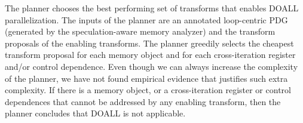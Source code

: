 The planner chooses the best performing set of transforms that enables
DOALL parallelization.
%
The inputs of the planner are an annotated loop-centric PDG (generated
by the speculation-aware memory analyzer) and the transform proposals
of the enabling transforms.
%
%
%
The planner greedily selects the cheapest transform proposal for each
memory object and for each cross-iteration register and/or control
dependence.
%
%
Even though we can always increase the complexity of the planner, we
have not found empirical evidence that justifies such extra
complexity.
%
If there is a memory object, or a cross-iteration register or control
dependences that cannot be addressed by any enabling transform, then
the planner concludes that DOALL is not applicable.
%
%
%
